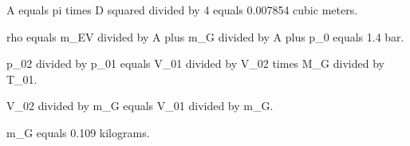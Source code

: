 A equals pi times D squared divided by 4 equals 0.007854 cubic meters.

rho equals m_EV divided by A plus m_G divided by A plus p_0 equals 1.4 bar.

p_02 divided by p_01 equals V_01 divided by V_02 times M_G divided by T_01.

V_02 divided by m_G equals V_01 divided by m_G.

m_G equals 0.109 kilograms.